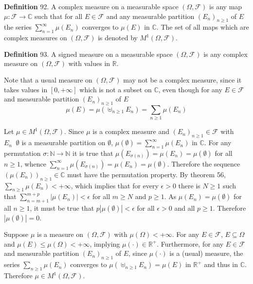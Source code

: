 \documentclass[a4paper]{article}
\newcommand{\clo}[1]{\left [ #1 \right ]}
\newcommand{\brac}[1]{\left ( #1 \right )}
\newcommand{\abs}[1]{\left | #1 \right |}
\newcommand{\Real}{\mathbb{R}}
\newcommand{\Zinf}{\clo{ 0, +\infty }}
\newcommand{\Cplx}{\mathbb{C}}
\newcommand{\Fcal}{\mathcal{F}}
\newcommand{\defn}{\mathop{\overset{\Delta}{=}}\nolimits}
\begin{document}
\noindent \textbf{Definition} 92.
A complex measure on a measurable space $\brac{\Omega, \Fcal}$ is any map $\mu:\Fcal\to \Cplx$ such that for all $E\in\Fcal$ and any measurable partition $\brac{E_n}_{n\geq 1}$ of $E$ the series $\sum_{n=1}^\infty \mu\brac{E_n}$ converges to $\mu\brac{E}$ in $\Cplx$. The set of all maps which are complex measures on $\brac{\Omega, \Fcal}$ is denoted by $M^1\brac{\Omega, \Fcal}$.

\noindent \textbf{Definition} 93.
A signed measure on a measurable space $\brac{\Omega, \Fcal}$ is any complex measure on $\brac{\Omega, \Fcal}$ with values in $\Real$.

Note that a usual measure on $\brac{\Omega, \Fcal}$ may not be a complex measure, since it takes values in $\Zinf$ which is not a subset on $\Cplx$, even though for any $E\in \Fcal$ and measurable partition $\brac{E_n}_{n\geq 1}$ of $E$ \[\mu\brac{E} = \mu\brac{\uplus_{n\geq 1} E_n} = \sum_{n\geq 1} \mu\brac{E_n}\]

Let $\mu\in M^1\brac{\Omega, \Fcal}$. Since $\mu$ is a complex measure and $\brac{E_n}_{n\geq 1}\in\Fcal$ with $E_n\defn \emptyset$ is a measurable partition on $\emptyset$, $\mu\brac{\emptyset} = \sum_{n=1}^\infty \mu\brac{E_n}$ in $\Cplx$. For any permutation $\sigma:\mathbb{N}\to\mathbb{N}$ it is true that $\mu\brac{E_{\sigma\brac{n}}} = \mu\brac{E_n}=\mu\brac{\emptyset}$ for all $n\geq 1$, whence $\sum_{n=1}^\infty \mu\brac{E_{\sigma\brac{n}}} = \mu\brac{E_n} = \mu\brac{\emptyset}$. Therefore the sequence $\brac{\mu\brac{E_n}}_{n\geq1}\in \Cplx$ must have the permutation property. By theorem 56, $\sum_{n\geq 1} \mu\brac{E_n} < +\infty$, which implies that for every $\epsilon>0$ there is $N\geq 1$ such that $\sum_{n=m+1}^{m+p} \abs{\mu\brac{E_n}} < \epsilon$ for all $m\geq N$ and $p\geq 1$. As $\mu\brac{E_n}=\mu\brac{\emptyset}$ for all $n\geq 1$, it must be true that $p \abs{\mu\brac{\emptyset}}<\epsilon$ for all $\epsilon>0$ and all $p\geq1$. Therefore $\abs{\mu\brac{\emptyset}}=0$.

Suppose $\mu$ is a measure on $\brac{\Omega, \Fcal}$ with $\mu\brac{\Omega}<+\infty$. For any $E\in \Fcal$, $E\subseteq \Omega$ and $\mu\brac{E}\leq \mu\brac{\Omega}<+\infty$, implying $\mu\brac{\cdot}\in \Real^+$. Furthermore, for any $E\in\Fcal$ and measurable partition $\brac{E_n}_{n\geq 1}$ of $E$, since $\mu\brac{\cdot}$ is a (usual) measure, the series $\sum_{n\geq 1} \mu\brac{E_n}$ converges to $\mu\brac{\uplus_{n\geq 1} E_n} = \mu\brac{E}$ in $\Real^+$ and thus in $\Cplx$. Therefore $\mu\in M^1\brac{\Omega, \Fcal}$.
\end{document}
